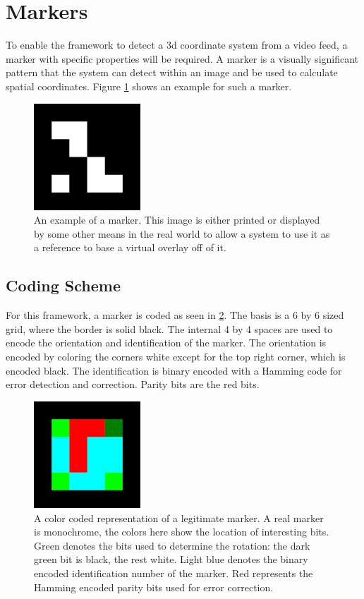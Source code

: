 \section{Markers}
\label{section_markers}

To enable the framework to detect a 3d coordinate system from a video feed, a marker with specific properties will be required.
A marker is a visually significant pattern that the system can detect within an image and be used to calculate spatial coordinates. Figure \ref{fig:marker_example} shows an example for such a marker.

\begin{figure}
	\centering
	\includegraphics[width=4cm]{img/marker_example.png}
	\caption[Example Marker.]{An example of a marker. This image is either printed or displayed by some other means in the real world to allow a system to use it as a reference to base a virtual overlay off of it.}
	\label{fig:marker_example}
\end{figure}

\subsection{Coding Scheme}

For this framework, a marker is coded as seen in \ref{fig:marker_template}.
The basis is a 6 by 6 sized grid, where the border is solid black.
The internal 4 by 4 spaces are used to encode the orientation and identification of the marker.
The orientation is encoded by coloring the corners white except for the top right corner, which is encoded black.
The identification is binary encoded with a Hamming code for error detection and correction.
Parity bits are the red bits.

\begin{figure}
	\centering
	\includegraphics[width=4cm]{img/marker_template.png}
	\caption[Template Marker.]{A color coded representation of a legitimate marker. A real marker is monochrome, the colors here show the location of interesting bits. Green denotes the bits used to determine the rotation: the dark green bit is black, the rest white. Light blue denotes the binary encoded identification number of the marker. Red represents the Hamming encoded parity bits used for error correction.}
	\label{fig:marker_template}
\end{figure}

